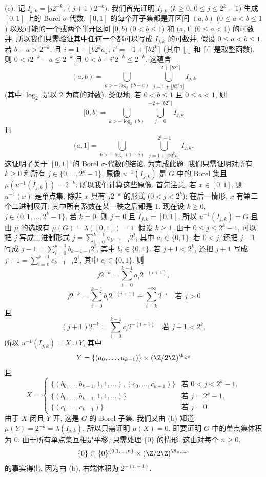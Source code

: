 \begin{solution}
(c). 记 $I_{j,k} = [j2^{-k}, (j+1)2^{-k})$. 我们首先证明 $I_{j,k}$ ($k \geq 0$, $0 \leq j \leq 2^k - 1$) 生成 $[0,1]$ 上的 Borel $\sigma$-代数. $[0,1]$ 的每个开子集都是开区间 $(a, b)$ ($0 \leq a < b \leq 1$) 以及可能的一个或两个半开区间 $[0, b)$ ($0 < b \leq 1$) 和 $(a, 1]$ ($0 \leq a < 1$) 的可数并. 所以我们只需验证其中任何一个都可以写成 $I_{j,k}$ 的可数并.
假设 $0 \leq a < b \leq 1$. 若 $b - a > 2^{-k}$, 且 $i = 1 + \lfloor b2^k a \rfloor$, $i' = -1 + \lceil b2^k \rceil$ (其中 $\lfloor\cdot\rfloor$ 和 $\lceil\cdot\rceil$ 是取整函数), 则 $0 < i2^{-k} - a \leq 2^{-k}$ 且 $0 < b - i'2^{-k} \leq 2^{-k}$. 这蕴含
\[
(a, b) = \bigcup_{k > -\log_2(b-a)}\ \bigcup_{j=1+\lfloor b2^k a \rfloor}^{-2+\lceil b2^k \rceil} I_{j,k}
\]
(其中 $\log_2$ 是以 $2$ 为底的对数). 类似地, 若 $0 < b \leq 1$ 且 $0 \leq a < 1$, 则
\[
[0, b) = \bigcup_{k > -\log_2(b)}\ \bigcup_{j=0}^{-2+\lceil b2^k \rceil} I_{j,k}
\]
且
\[
(a, 1] = \bigcup_{k > -\log_2(1-a)}\ \bigcup_{j=1+\lfloor b2^k a \rfloor}^{2^k - 1} I_{j,k}.
\]
这证明了关于 $[0,1]$ 的 Borel $\sigma$-代数的结论. 为完成此题, 我们只需证明对所有 $k \geq 0$ 和所有 $j \in \{0,\ldots,2^k-1\}$, 原像 $u^{-1}(I_{j,k})$ 是 $G$ 中的 Borel 集且 $\mu(u^{-1}(I_{j,k})) = 2^{-k}$. 所以我们计算这些原像.
首先注意, 若 $x \in [0,1]$, 则 $u^{-1}(x)$ 是单点集, 除非 $x$ 具有 $j2^{-k}$ 的形式 ($0 < j < 2^k$); 在后一情形, $x$ 有第二个二进制展开, 其中所有系数在某一秩之后都是 $1$.
现在设 $k \geq 0$, $j \in \{0,1,\ldots,2^k-1\}$. 若 $k = 0$, 则 $j = 0$ 且 $I_{j,k} = [0,1]$, 所以 $u^{-1}(I_{j,k}) = G$ 且由 $\mu$ 的选取有 $\mu(G) = \lambda([0,1]) = 1$. 假设 $k \geq 1$. 由于 $0 \leq j \leq 2^k - 1$, 可以把 $j$ 写成二进制形式 $j = \sum_{i=0}^{k-1}a_{k-1-i}2^i$, 其中 $a_i \in \{0,1\}$. 若 $0 < j$, 还把 $j - 1$ 写成 $j - 1 = \sum_{i=0}^{k-1}b_{k-1-i}2^i$, 其中 $b_i \in \{0,1\}$. 若 $j + 1 < 2^k$, 还把 $j + 1$ 写成 $j + 1 = \sum_{i=0}^{k-1}c_{k-1-i}2^i$, 其中 $c_i \in \{0,1\}$. 则
\[
j2^{-k} = \sum_{i=0}^{k-1}a_i2^{-(i+1)},
\]
\[
j2^{-k} = \sum_{i=0}^{k-1}b_i2^{-(i+1)} + \sum_{i=k}^{+\infty}2^{-i} \quad \text{若 } j > 0
\]
且
\[
(j+1)2^{-k} = \sum_{i=0}^{k-1}c_i2^{-(i+1)} \quad \text{若 } j + 1 < 2^k,
\]
所以 $u^{-1}(I_{j,k}) = X \cup Y$, 其中
\[
Y = \{(a_0,\ldots,a_{k-1})\} \times (\Z/2\Z)^{\N_{\geq k}}
\]
且
\[
X = \begin{cases} \{(b_0,\ldots,b_{k-1},1,1,\ldots),(c_0,\ldots,c_{k-1})\} & \text{若 } 0 < j < 2^k - 1, \\ \{(b_0,\ldots,b_{k-1},1,1,\ldots)\} & \text{若 } j = 2^k - 1, \\ \{(c_0,\ldots,c_{k-1})\} & \text{若 } j = 0. \end{cases}
\]
由于 $X$ 闭且 $Y$ 开, 这是 $G$ 的 Borel 子集. 我们又由 (b) 知道 $\mu(Y) = 2^{-k} = \lambda(I_{j,k})$, 所以只需证明 $\mu(X) = 0$. 即要证明 $G$ 中的单点集体积为 $0$. 由于所有单点集互相是平移, 只需处理 $\{0\}$ 的情形. 这由对每个 $n \geq 0$,
\[
\{0\} \subset \{0\}^{\{0,1,\ldots,n\}} \times (\Z/2\Z)^{\N_{\geq n+1}}
\]
的事实得出, 因为由 (b), 右端体积为 $2^{-(n+1)}$.
\end{solution}

